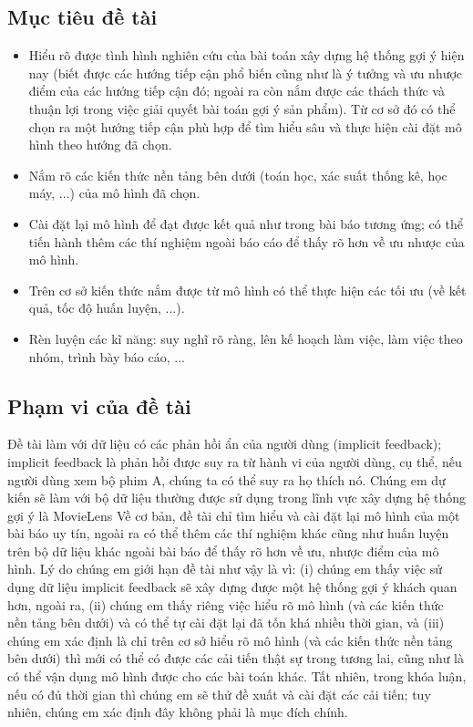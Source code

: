 \documentclass{article}[14pt]
\begin{document}
{      \subsection{Mục tiêu đề tài}
      
      \begin{itemize}
        \item     Hiểu rõ được tình hình nghiên cứu của bài toán xây dựng hệ thống gợi ý
         hiện nay (biết được các hướng tiếp cận phổ biến cũng như là ý tưởng 
         và ưu nhược điểm của các hướng tiếp cận đó; ngoài ra còn nắm được các 
         thách thức và thuận lợi trong việc giải quyết bài toán gợi ý sản phẩm). Từ cơ 
         sở đó có thể chọn ra một hướng tiếp cận phù hợp để tìm hiểu sâu và thực hiện 
         cài đặt mô hình theo hướng đã chọn.
        \item      Nắm rõ các kiến thức nền tảng bên dưới (toán học, xác suất thống kê, 
        học máy, ...) của mô hình đã chọn.
        \item     Cài đặt lại mô hình  để đạt được kết quả như trong bài báo tương ứng; 
        có thể tiến hành thêm các thí nghiệm ngoài báo cáo để thấy rõ hơn về ưu nhược 
        của mô hình.
        \item     Trên cơ sở kiến thức nắm được từ mô hình có thể thực hiện các tối ưu 
        (về kết quả, tốc độ huấn luyện, ...).
        \item     Rèn luyện các kĩ năng: suy nghĩ rõ ràng, lên kế hoạch làm việc, 
        làm việc theo nhóm, trình bày báo cáo, ...
        \end{itemize}

    
    \subsection{Phạm vi của đề tài}
    
    Đề tài làm với dữ liệu có các phản hồi ẩn của người dùng (implicit feedback);
     implicit feedback là phản hồi được suy ra từ hành vi của người dùng, 
    cụ thể, nếu người dùng xem bộ phim A, chúng ta có thể suy ra họ thích nó. 
    Chúng em dự kiến sẽ làm với bộ dữ liệu thường được sử 
    dụng trong lĩnh vực xây dựng  hệ thống gợi ý là MovieLens
    Về cơ bản, đề tài chỉ tìm hiểu và cài đặt lại mô hình của một bài báo uy 
tín, ngoài ra có thể thêm các thí nghiệm khác cũng như huấn luyện trên 
bộ dữ liệu khác ngoài bài báo để thấy rõ hơn về ưu, nhược điểm của mô 
hình.
    Lý do chúng em giới hạn đề tài như vậy là vì: (i) chúng em thấy việc sử dụng 
    dữ liệu implicit feedback sẽ xây dựng được một hệ thống gợi ý khách quan hơn, 
     ngoài ra, (ii) chúng em thấy riêng 
việc hiểu rõ mô hình (và các kiến thức nền tảng bên dưới) và có thể tự 
cài đặt lại đã tốn khá nhiều thời gian, và (iii) chúng em xác định là chỉ 
trên cơ sở hiểu rõ mô hình (và các kiến thức nền tảng bên dưới) thì mới 
có thể có được các cải tiến thật sự trong tương lai, cũng như là có thể 
vận dụng mô hình được cho các bài toán khác.
    Tất nhiên, trong khóa luận, nếu có đủ thời gian thì chúng em sẽ thử đề 
xuất và cài đặt các cải tiến; tuy nhiên, chúng em xác định đây không 
phải là mục đích chính.
    
}
\end{document}
